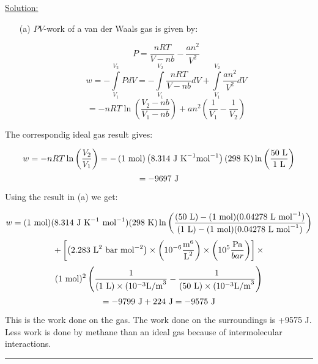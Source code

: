 \noindent
\underline{Solution:}\\

\begin{itemize}

\item[(a)] $PV$-work of a van der Waals gas is given by:

$$P = \frac{nRT}{V - nb} - \frac{an^2}{V^2}$$
$$w = -\int\limits_{V_1}^{V_2}PdV = -\int\limits_{V_1}^{V_2}\frac{nRT}{V - nb}dV + \int\limits_{V_1}^{V_2}\frac{an^2}{V^2}dV$$
$$ = -nRT\ln\left(\frac{V_2 - nb}{V_1 - nb}\right) + an^2\left(\frac{1}{V_1} - \frac{1}{V_2}\right)$$
\end{itemize}

\item[(b)] The correspondig ideal gas result gives:

$$w = -nRT\ln\left(\frac{V_2}{V_1}\right) = -\left(1\textnormal{ mol}\right)\left(8.314\textnormal{ J K}^{-1}\textnormal{mol}^{-1}\right)\left(298\textnormal{ K}\right)\ln\left(\frac{50\textnormal{ L}}{1\textnormal{ L}}\right)$$
$$ = -9697\textnormal{ J}$$

\item[(c)] Using the result in (a) we get:

$$w = (1\textnormal{ mol})(8.314\textnormal{ J K}^{-1}\textnormal{ mol}^{-1})(298\textnormal{ K})\ln\left(\frac{(50\textnormal{ L}) - (1\textnormal{ mol})(0.04278\textnormal{ L mol}^{-1})}{(1\textnormal{ L}) - (1\textnormal{ mol})(0.04278\textnormal{ L mol}^{-1})}\right)$$
$$ + \left[\left(2.283\textnormal{ L}^2\textnormal{ bar mol}^{-2}\right)\times\left(10^{-6}\frac{\textnormal{m}^6}{\textnormal{L}^2}\right)\times\left(10^5\frac{\textnormal{Pa}}{bar}\right)\right]\times$$
$$(1\textnormal{ mol})^2\left(\frac{1}{(1\textnormal{ L})\times(10^{-3}\textnormal{L/m}^3} - \frac{1}{(50\textnormal{ L})\times(10^{-3}\textnormal{L/m}^3}\right)$$
$$ = -9799\textnormal{ J} + 224\textnormal{ J} = -9575\textnormal{ J}$$

This is the work done on the gas. The work done on the surroundings is +9575 J. Less work is done by methane than an ideal gas because of intermolecular interactions.

\hrule\vspace{0.5cm}

